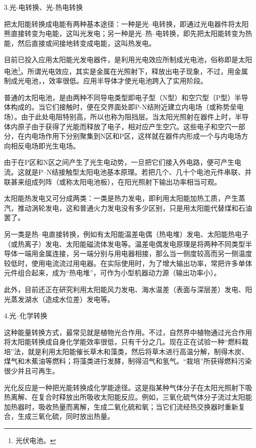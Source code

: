 \documentclass{ctexbook}
\begin{document}
3.光-电转换、光-热电转换

把太阳能转换成电能有两种基本途径：一种是光--电转换，即通过光电器件将太阳熊直接转变为电能，这叫光发电；另一种是光--热--电转换，即先把太阳能转变为热能，然后直接或间接地转变成电能，这叫热发电。

目前已投入应用太阳能光发电器件，是利用光电效应所制成光电池，俗称即是太阳电池\footnote{光伏电池。}。所谓光电效应，其实是金属在光照射下，释放出电子现象，不过，用金属制成光电池，，效率很低。应用半导体才使光电池跨入了实用阶段。

普通的太阳电池，是由两种不同导电类型即电子型（N型）和空穴型（P型）半导体构成的。当它们接触时，便在交界面处即P-N结附近建立内电场（或称势垒电场）。由于此处电阻特别高，所以也称为阻挡层。当太阳光照射在器件上时，半导体内原子由于获得了光能而释放了电子，相对应产生空穴。这些电子和空穴一部分，在内电场作用下分别聚集到N区和P区，这样就在器件内形成一个与内电场方向相反电场即光生电场。

由于在P区和N区之间产生了光生电动势，一旦把它们接入外电路，便可产生电流。这就是P--N结接触型太阳电池基本原理。若把几个、几十个电池元件串联、并联甚来组成列阵（或称太阳电池板），在阳光照射下输出功率相当可观。

太阳能热发电又可分成两类：一类是热力发电，即利用太阳能加热工质，产生蒸汽，推动涡轮发电，这和普通火力发电没有多少区别，只是用太阳能代替煤和石油罢了。

另一类是热--电直接转换，例如有太阳能温差电偶（热电堆）发电、太阳能热电子（或热离子）发电、太阳能磁流体发电等。温差电偶发电原理是将两种不同类型半导体一端用金属连接，另一端分别与用电器相接，那么当一侧度较高而另一侧温度较低时，使用电流流过用电器。在实际使用时，为了增大输出功率，常把许多单体元件组合起来，成为“热电堆”，可作为小型机器动力源（输出功率小）。


此外，目前还正在研究利用太阳能风力发电、海水温差（表面与深层差）发电、阳光蒸发湖水（造成水位差）发电等。

4.光--化学转换

这种能量转换方式，最常见就是植物光合作用。不过，自然界中植物通过光合作用将太阳能转换成自身化学能效率很低，只有千分之几。现在正在试验一种“燃料栽培”法，就是利用太阳能催长草木和藻类，然后将草木进行高温分解，制得木炭、煤气和木蕉油等燃料；将藻类进行发酵，制得沼气和氢气。“栽培”所获得燃料污染很少并且可再生。

光化反应是一种把光能转换成化学能途径。这是指某种气体分子在太阳光照射下吸热离解、在复合时释放出所吸收太阳能反应。例如，三氧化硫气体分子流过太阳能加热器时，吸收热量而离解，生成二氧化硫和氧；当它们流经热交换器时重新复合，生成三氧化硫，同时放出热量。
\end{document}
